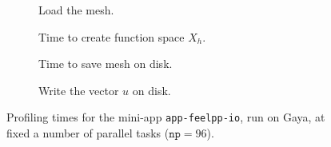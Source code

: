 \begin{figure}
  \begin{subfigure}[c]{0.49\textwidth}
    \centering
    \caption{ Load the mesh. }
    \label{fig:specs:app-feelpp-io:disc:loadmesh}
  \end{subfigure}
  \begin{subfigure}[c]{0.49\textwidth}
    \centering
    \caption{ Time to create function space $X_h$. }
    \label{fig:specs:app-feelpp-io:disc:functionspace}
  \end{subfigure}
  \begin{subfigure}[c]{0.49\textwidth}
    \centering
    \caption{ Time to save mesh on disk. }
    \label{fig:specs:app-feelpp-io:disc:savemesh}
  \end{subfigure}
  \begin{subfigure}[c]{0.49\textwidth}
    \centering
    \caption{ Write  the vector $u$ on disk. }
    \label{fig:specs:app-feelpp-io:disc:export}
  \end{subfigure}
  \caption{Profiling times for the mini-app \texttt{app-feelpp-io}, run on Gaya, at fixed a number of parallel tasks ($\texttt{np}=96$).}
  \label{fig:specs:app-feelpp-io:disc}
\end{figure}
